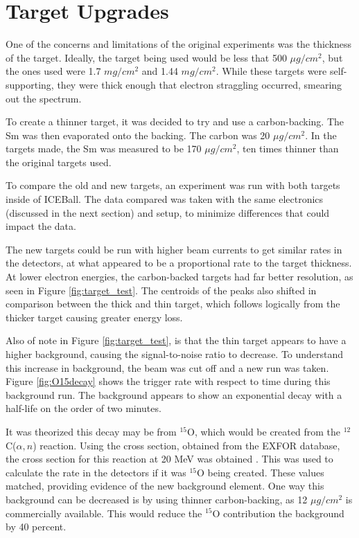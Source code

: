 

\section{Target Upgrades}

One of the concerns and limitations of the original experiments was the thickness of the target. Ideally, the target being used would be less that 500 $\mu g/cm^2$, but the ones used were 1.7 $mg/cm^2$ and 1.44 $mg/cm^2$. While these targets were self-supporting, they were thick enough that electron straggling occurred, smearing out the spectrum.

To create a thinner target, it was decided to try and use a carbon-backing. The Sm was then evaporated onto the backing. The carbon was 20 $\mu g/cm^2$. In the targets made, the Sm was measured to be 170 $\mu g/cm^2$, ten times thinner than the original targets used.

To compare the old and new targets, an experiment was run with both targets inside of ICEBall. The data compared was taken with the same electronics (discussed in the next section) and setup, to minimize differences that could impact the data.

The new targets could be run with higher beam currents to get similar rates in the detectors, at what appeared to be a proportional rate to the target thickness. At lower electron energies, the carbon-backed targets had far better resolution, as seen in Figure \ref{fig:target_test}. The centroids of the peaks also shifted in comparison between the thick and thin target, which follows logically from the thicker target causing greater energy loss. 

Also of note in Figure \ref{fig:target_test}, is that the thin target appears to have a higher background, causing the signal-to-noise ratio to decrease. To understand this increase in background, the beam was cut off and a new run was taken. Figure \ref{fig:O15decay} shows the trigger rate with respect to time during this background run. The background appears to show an exponential decay with a half-life on the order of two minutes.





It was theorized this decay may be from $^{15}$O, which would be created from the $^{12}$C($\alpha,n$) reaction. Using the cross section, obtained from the EXFOR database, the cross section for this reaction at 20 MeV was obtained \citep{zerkin18:_exfor,black69:_carbonalphan}. This was used to calculate the rate in the detectors if it was $^{15}$O being created. These values matched, providing evidence of the new background element. One way this background can be decreased is by using thinner carbon-backing, as 12 $\mu g/cm^2$ is commercially available. This would reduce the $^{15}$O contribution the background by 40 percent.

